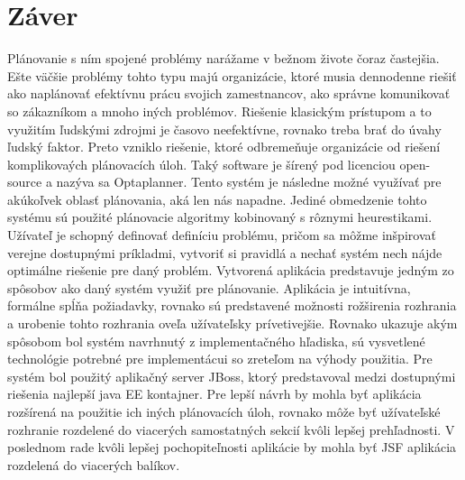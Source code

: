 \chapter{Záver}
Plánovanie s ním spojené problémy narážame v bežnom živote čoraz častejšia. Ešte väčšie problémy tohto typu majú organizácie, ktoré musia dennodenne riešiť ako naplánovať efektívnu prácu svojich zamestnancov, ako správne komunikovať so zákazníkom a mnoho iných problémov. Riešenie klasickým prístupom a to využitím ľudskými zdrojmi je časovo neefektívne, rovnako treba brať do úvahy ľudský faktor. Preto vzniklo riešenie, ktoré odbremeňuje organizácie od riešení komplikovaých plánovacích úloh. Taký software je šírený pod licenciou open-source a nazýva sa Optaplanner. Tento systém je následne možné využívať pre akúkoľvek oblasť plánovania, aká len nás napadne. Jediné obmedzenie tohto systému sú použité plánovacie algoritmy kobinovaný s rôznymi heurestikami. Užívateľ je schopný definovať definíciu problému, pričom sa môžme inšpirovať verejne dostupnými príkladmi, vytvoriť si pravidlá a nechať systém nech nájde optimálne riešenie pre daný problém. Vytvorená aplikácia predstavuje jedným zo spôsobov ako daný systém využiť pre plánovanie. Aplikácia je intuitívna, formálne spĺňa požiadavky, rovnako sú predstavené možnosti rožširenia rozhrania a urobenie tohto rozhrania oveľa užívateľsky prívetivejšie.  Rovnako ukazuje akým spôsobom bol systém navrhnutý z implementačného hľadiska, sú vysvetlené technológie potrebné pre implementácui so zreteľom na výhody použitia. Pre systém bol použitý aplikačný server JBoss, ktorý predstavoval medzi dostupnými riešenia najlepší java EE kontajner. Pre lepší návrh by mohla byť aplikácia rozšírená na použitie ich iných plánovacích úloh, rovnako môže byť užívateľské rozhranie rozdelené do viacerých samostatných sekcií kvôli lepšej prehľadnosti. V poslednom rade kvôli lepšej pochopiteľnosti aplikácie by mohla byť JSF aplikácia rozdelená do viacerých balíkov.


